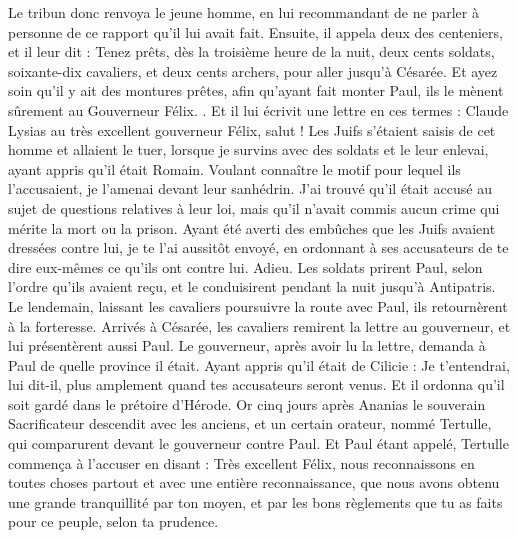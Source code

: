 \begin{multicols}{2}
Le tribun donc renvoya le jeune homme, en lui recommandant de ne parler à personne de ce rapport qu'il lui avait fait.
Ensuite, il appela deux des centeniers, et il leur dit : Tenez prêts, dès la troisième heure de la nuit, deux cents soldats, soixante-dix cavaliers, et deux cents archers, pour aller jusqu'à Césarée.
Et ayez soin qu'il y ait des montures prêtes, afin qu'ayant fait monter Paul, ils le mènent sûrement au Gouverneur Félix. .
Et il lui écrivit une lettre en ces termes :
Claude Lysias au très excellent gouverneur Félix, salut !
Les Juifs s'étaient saisis de cet homme et allaient le tuer, lorsque je survins avec des soldats et le leur enlevai, ayant appris qu'il était Romain.
Voulant connaître le motif pour lequel ils l'accusaient, je l'amenai devant leur sanhédrin.
J'ai trouvé qu'il était accusé au sujet de questions relatives à leur loi, mais qu'il n'avait commis aucun crime qui mérite la mort ou la prison.
Ayant été averti des embûches que les Juifs avaient dressées contre lui, je te l'ai aussitôt envoyé, en ordonnant à ses accusateurs de te dire eux-mêmes ce qu'ils ont contre lui. Adieu.
Les soldats prirent Paul, selon l'ordre qu'ils avaient reçu, et le conduisirent pendant la nuit jusqu'à Antipatris.
Le lendemain, laissant les cavaliers poursuivre la route avec Paul, ils retournèrent à la forteresse.
Arrivés à Césarée, les cavaliers remirent la lettre au gouverneur, et lui présentèrent aussi Paul.
Le gouverneur, après avoir lu la lettre, demanda à Paul de quelle province il était. Ayant appris qu'il était de Cilicie :
Je t'entendrai, lui dit-il, plus amplement quand tes accusateurs seront venus. Et il ordonna qu'il soit gardé dans le prétoire d'Hérode.
\VerseOne{}Or cinq jours après Ananias le souverain Sacrificateur descendit avec les anciens, et un certain orateur, nommé Tertulle, qui comparurent devant le gouverneur contre Paul. 
Et Paul étant appelé, Tertulle commença à l'accuser en disant :
Très excellent Félix, nous reconnaissons en toutes choses partout et avec une entière reconnaissance, que nous avons obtenu une grande tranquillité par ton moyen, et par les bons règlements que tu as faits pour ce peuple, selon ta prudence.

\end{multicols}
